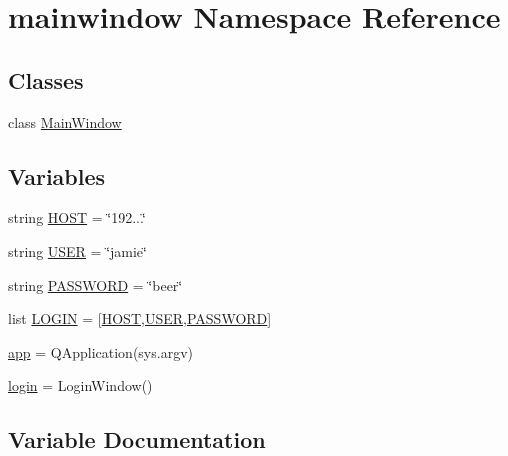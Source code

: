 \hypertarget{namespacemainwindow}{}\section{mainwindow Namespace Reference}
\label{namespacemainwindow}
\subsection*{Classes}
\begin{DoxyCompactItemize}
\item 
class \mbox{\hyperlink{classmainwindow_1_1_main_window}{Main\+Window}}
\end{DoxyCompactItemize}
\subsection*{Variables}
\begin{DoxyCompactItemize}
\item 
string \mbox{\hyperlink{namespacemainwindow_a84d2c2e5d196b2ba90c507d0cec59608}{H\+O\+ST}} = \char`\"{}192...\char`\"{}
\item 
string \mbox{\hyperlink{namespacemainwindow_a08ced40f6e9dec6e6baebf53dd6d2c6a}{U\+S\+ER}} = \char`\"{}jamie\char`\"{}
\item 
string \mbox{\hyperlink{namespacemainwindow_a9c35ad9c903521379a9dc1171bbe11b4}{P\+A\+S\+S\+W\+O\+RD}} = \char`\"{}beer\char`\"{}
\item 
list \mbox{\hyperlink{namespacemainwindow_af4882c18203e8931620b97e2e834a008}{L\+O\+G\+IN}} = \mbox{[}\mbox{\hyperlink{namespacemainwindow_a84d2c2e5d196b2ba90c507d0cec59608}{H\+O\+ST}},\mbox{\hyperlink{namespacemainwindow_a08ced40f6e9dec6e6baebf53dd6d2c6a}{U\+S\+ER}},\mbox{\hyperlink{namespacemainwindow_a9c35ad9c903521379a9dc1171bbe11b4}{P\+A\+S\+S\+W\+O\+RD}}\mbox{]}
\item 
\mbox{\hyperlink{namespacemainwindow_a56cb8abb2a612558f95ef1bf0c4eb541}{app}} = Q\+Application(sys.\+argv)
\item 
\mbox{\hyperlink{namespacemainwindow_a1e38a99874e3df5d91680ea8faeba369}{login}} = Login\+Window()
\end{DoxyCompactItemize}


\subsection{Variable Documentation}
\mbox{\label{namespacemainwindow_a56cb8abb2a612558f95ef1bf0c4eb541}} 
